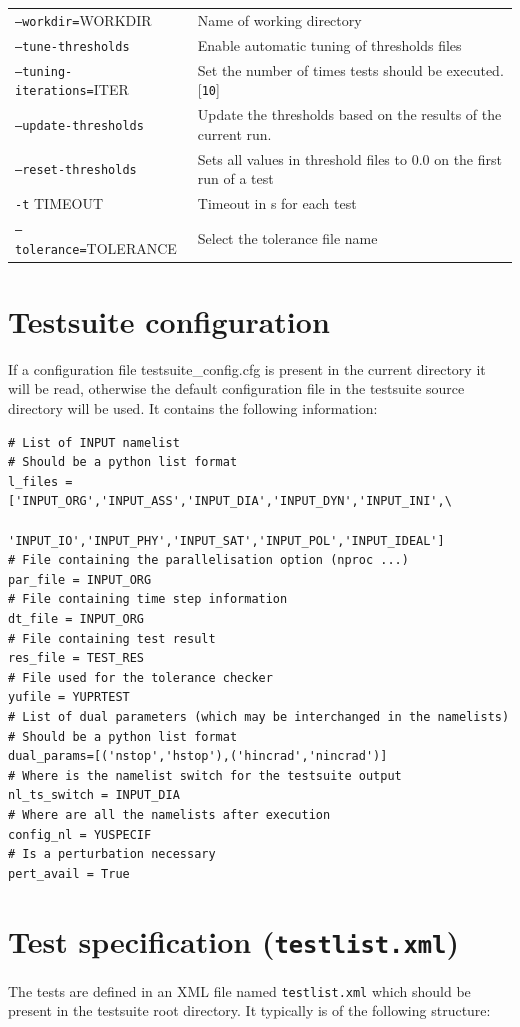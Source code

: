 \documentclass[12pt,twoside,a4paper]{report}
\begin{document}
\begin{longtable}{lp{10cm}}
\texttt{--workdir=}WORKDIR & Name of working directory \\[1.2ex]
\texttt{--tune-thresholds} & Enable automatic tuning of thresholds files \\[1.2ex]
\texttt{--tuning-iterations=}ITER & Set the number of times tests should be executed. [\texttt{10}]\\[1.2ex]
\texttt{--update-thresholds} & Update the thresholds based on the results of the current run. \\[1.2ex]
\texttt{--reset-thresholds} & Sets all values in threshold files to 0.0 on the first run of a test\\[1.2ex]
\texttt{-t} TIMEOUT & Timeout in s for each test\\[1.2ex]
\texttt{--tolerance=}TOLERANCE & Select the tolerance file name\\[1.2ex]
\end{longtable}

\section{Testsuite configuration}
If a configuration file testsuite\_config.cfg is present in the current
directory it will be read, otherwise the default configuration file in the
testsuite source directory will be used. It contains the following
information:
\begin{verbatim}
# List of INPUT namelist 
# Should be a python list format
l_files = ['INPUT_ORG','INPUT_ASS','INPUT_DIA','INPUT_DYN','INPUT_INI',\
           'INPUT_IO','INPUT_PHY','INPUT_SAT','INPUT_POL','INPUT_IDEAL']
# File containing the parallelisation option (nproc ...)
par_file = INPUT_ORG
# File containing time step information
dt_file = INPUT_ORG
# File containing test result
res_file = TEST_RES
# File used for the tolerance checker
yufile = YUPRTEST
# List of dual parameters (which may be interchanged in the namelists)
# Should be a python list format
dual_params=[('nstop','hstop'),('hincrad','nincrad')]
# Where is the namelist switch for the testsuite output
nl_ts_switch = INPUT_DIA
# Where are all the namelists after execution
config_nl = YUSPECIF
# Is a perturbation necessary
pert_avail = True
\end{verbatim}

\newpage
\section{Test specification (\texttt{testlist.xml})}
\label{sec:testlist}
The tests are defined in an XML file named \texttt{testlist.xml} which should be present in the testsuite root directory. It typically is of the following structure:
\end{document}
